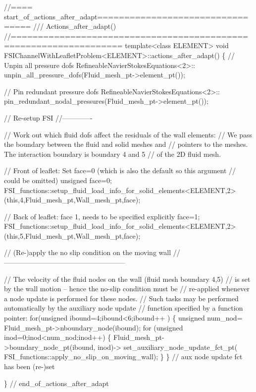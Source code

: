 \begin{DoxyCodeInclude}
\textcolor{comment}{//==== start\_of\_actions\_after\_adapt=================================}
\textcolor{comment}{/// Actions\_after\_adapt()}
\textcolor{comment}{}\textcolor{comment}{//==================================================================}
\textcolor{keyword}{template}<\textcolor{keyword}{class} ELEMENT>
\textcolor{keywordtype}{void} FSIChannelWithLeafletProblem<ELEMENT>::actions\_after\_adapt()
\{
 \textcolor{comment}{// Unpin all pressure dofs}
 RefineableNavierStokesEquations<2>::
  unpin\_all\_pressure\_dofs(Fluid\_mesh\_pt->element\_pt());

 \textcolor{comment}{// Pin redundant pressure dofs}
 RefineableNavierStokesEquations<2>::
  pin\_redundant\_nodal\_pressures(Fluid\_mesh\_pt->element\_pt());


 \textcolor{comment}{// Re-setup FSI}
 \textcolor{comment}{//-------------}

 \textcolor{comment}{// Work out which fluid dofs affect the residuals of the wall elements:}
 \textcolor{comment}{// We pass the boundary between the fluid and solid meshes and}
 \textcolor{comment}{// pointers to the meshes. The interaction boundary is boundary 4 and 5}
 \textcolor{comment}{// of the 2D fluid mesh.}

 \textcolor{comment}{// Front of leaflet: Set face=0 (which is also the default so this argument}
 \textcolor{comment}{// could be omitted)}
 \textcolor{keywordtype}{unsigned} face=0;
 FSI\_functions::setup\_fluid\_load\_info\_for\_solid\_elements<ELEMENT,2>
  (\textcolor{keyword}{this},4,Fluid\_mesh\_pt,Wall\_mesh\_pt,face);

 \textcolor{comment}{// Back of leaflet: face 1, needs to be specified explicitly}
 face=1;
 FSI\_functions::setup\_fluid\_load\_info\_for\_solid\_elements<ELEMENT,2>
  (\textcolor{keyword}{this},5,Fluid\_mesh\_pt,Wall\_mesh\_pt,face);

 \textcolor{comment}{// (Re-)apply the no slip condition on the moving wall}
 \textcolor{comment}{//-----------------------------------------------------}

 \textcolor{comment}{// The velocity of the fluid nodes on the wall (fluid mesh boundary 4,5)}
 \textcolor{comment}{// is set by the wall motion -- hence the no-slip condition must be}
 \textcolor{comment}{// re-applied whenever a node update is performed for these nodes.}
 \textcolor{comment}{// Such tasks may be performed automatically by the auxiliary node update}
 \textcolor{comment}{// function specified by a function pointer:}
 \textcolor{keywordflow}{for}(\textcolor{keywordtype}{unsigned} ibound=4;ibound<6;ibound++ )
  \{
   \textcolor{keywordtype}{unsigned} num\_nod= Fluid\_mesh\_pt->nboundary\_node(ibound);
   \textcolor{keywordflow}{for} (\textcolor{keywordtype}{unsigned} inod=0;inod<num\_nod;inod++)
    \{
     Fluid\_mesh\_pt->boundary\_node\_pt(ibound, inod)->
      set\_auxiliary\_node\_update\_fct\_pt(
       FSI\_functions::apply\_no\_slip\_on\_moving\_wall);
    \}
  \} \textcolor{comment}{// aux node update fct has been (re-)set}

\} \textcolor{comment}{// end\_of\_actions\_after\_adapt}

\end{DoxyCodeInclude}
